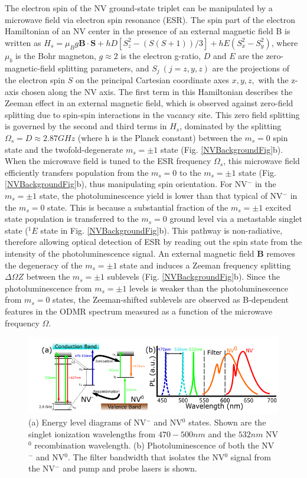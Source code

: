 The electron spin of the NV ground-state triplet can be manipulated by a microwave field via electron spin
resonance (ESR). The spin part of the electron Hamiltonian of an NV center in the presence of an external magnetic
field B is written as $H_s=\mu_B g\mathbf{B}\cdot\mathbf{S}+hD[S_z^2-(S(S+1))/3]+hE(S_x^2-S_y^2)$, where 
$\mu_b$ is the Bohr magneton, $g\approx 2$ is the electron g-ratio, $D$ and $E$ are the zero-magnetic-field
splitting parameters, and $S_j \ (j = z, y, z)$ are the projections of the electron spin $S$ on the principal
Cartesian coordinate axes $x, y, z,$ with the z-axis chosen along the NV axis. The first term in this Hamiltonian
describes the Zeeman effect in an external magnetic field, which is observed against zero-field splitting due to
spin-spin interactions in the vacancy site.  This zero field splitting is governed by the second and third terms
in $H_s$, dominated by the splitting $\Omega_s = D \approx 2.87\unit{GHz}$ (where h is the Planck constant) between the $m_s = 0$ spin state
and the twofold-degenerate $m_s = \pm1$ state (Fig. \ref{NVBackgroundFig}b).  When the microwave field is tuned to the ESR frequency $\Omega_s$,
this microwave field efficiently transfers population from the $m_s = 0$ to the $m_s = \pm1$ state (Fig. \ref{NVBackgroundFig}b), thus
manipulating spin orientation. For NV$^-$ in the $m_s = \pm1$ state, the photoluminescence yield is lower than
that typical of NV$^-$ in the $m_s = 0$ state.  This is because a substantial fraction of the $m_s = \pm1$ excited
state population is transferred to the $m_s = 0$ ground level via a metastable singlet state ($^{1}E$ state in Fig. \ref{NVBackgroundFig}b).
This pathway is non-radiative, therefore allowing optical detection of ESR by reading out the spin state from the
intensity of the photoluminescence signal. An external magnetic field $\mathbf{B}$ removes the degeneracy of the
$m_s = \pm1$ state and induces a Zeeman frequency splitting $\Delta\Omega{Z}$ between the $m_s = \pm1$ sublevels (Fig. \ref{NVBackgroundFig}b). Since the
photoluminescence from $m_s = \pm1$ levels is weaker than the photoluminescence from $m_s = 0$ states, the Zeeman-shifted
sublevels are observed as B-dependent features in the ODMR spectrum measured as a function of the microwave
frequency $\Omega$.

\begin{figure}
\centering
\includegraphics[width=1.0\textwidth]{Figures/IonizationEnergyandFilter.png}
\caption{(a) Energy level diagrams of NV$^-$ and NV$^0$ states. Shown are the singlet ionization wavelengths from $470-500\unit{nm}$ and the $532\unit{nm}$ NV$^0$ recombination wavelength. (b) Photoluminescence of both the NV$^-$ and NV$^0$. The filter bandwidth that isolates the NV$^0$ signal from the NV$^-$ and pump and probe lasers is shown.}
\label{IonizationEnergyandFilterFig}
\end{figure}

